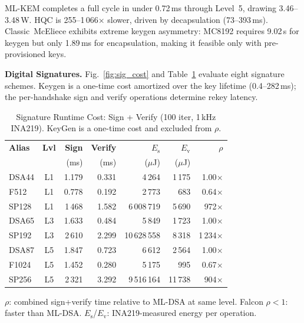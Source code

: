 ML-KEM completes a full cycle in under 0.72\,ms through Level~5,
drawing 3.46--3.48\,W.  HQC is 255--1\,066$\times$ slower, driven
by decapsulation (73--393\,ms).  Classic~McEliece exhibits extreme
keygen asymmetry: MC8192 requires 9.02\,s for keygen but only
1.89\,ms for encapsulation, making it feasible only with
pre-provisioned keys.

\medskip
\textbf{Digital Signatures.}\quad
Fig.~\ref{fig:sig_cost} and Table~\ref{tab:sig} evaluate eight
signature schemes.  Keygen is a one-time cost amortized over the
key lifetime (0.4--282\,ms); the per-handshake sign and verify
operations determine rekey latency.

\begin{table}[t]
\centering
\caption{Signature Runtime Cost: Sign + Verify (100 iter, 1\,kHz INA219).
  KeyGen is a one-time cost and excluded from $\rho$.}
\label{tab:sig}
\footnotesize
\begin{tabular}{@{}lcrrrrr@{}}
\toprule
\textbf{Alias} & \textbf{Lvl} &
  \textbf{Sign} & \textbf{Verify} &
  \textbf{$E_\text{s}$} & \textbf{$E_\text{v}$} &
  \textbf{$\rho$} \\
& & (ms) & (ms) & ($\mu$J) & ($\mu$J) & \\
\midrule
DSA44  & L1 & 1.179 & 0.331  & 4\,264  & 1\,175  & 1.00$\times$ \\
F512   & L1 & 0.778 & 0.192  & 2\,773  & 683     & 0.64$\times$ \\
SP128  & L1 & 1\,468 & 1.582  & 6\,008\,719 & 5\,690 & 972$\times$ \\
\midrule
DSA65  & L3 & 1.633 & 0.484  & 5\,849  & 1\,723  & 1.00$\times$ \\
SP192  & L3 & 2\,610 & 2.299  & 10\,628\,558 & 8\,318 & 1\,234$\times$ \\
\midrule
DSA87  & L5 & 1.847 & 0.723  & 6\,612  & 2\,564  & 1.00$\times$ \\
F1024  & L5 & 1.452 & 0.280  & 5\,175  & 995     & 0.67$\times$ \\
SP256  & L5 & 2\,321 & 3.292  & 9\,516\,164 & 11\,738 & 904$\times$ \\
\bottomrule
\end{tabular}
\begin{tablenotes}
\footnotesize
\item $\rho$: combined sign+verify time relative to ML-DSA at same
  level.  Falcon $\rho < 1$: faster than ML-DSA.
  $E_\text{s}$/$E_\text{v}$: INA219-measured energy per operation.
\end{tablenotes}
\end{table}

